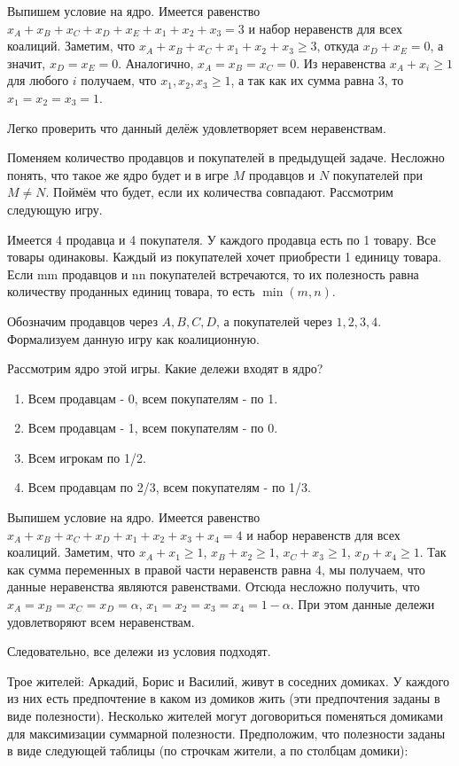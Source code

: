 	\solution
Выпишем условие на ядро. Имеется равенство $x_{A}+x_{B}+x_{C}+x_{D}+x_{E}+x_{1}+x_2+x_3=3$ и набор неравенств для всех коалиций. Заметим, что $x_A+x_B+x_C +x_1+x_2+x_3 \geq 3$, откуда $x_D+x_E=0$, а значит, $x_D=x_E=0$. Аналогично, $x_A=x_B=x_C=0$. Из неравенства $x_A+x_i\geq 1$ для любого $i$ получаем, что $x_1, x_2, x_3 \geq 1$, а так как их сумма равна 3, то $x_1=x_2=x_3=1$.

Легко проверить что данный делёж удовлетворяет всем неравенствам.
	
	\task
	Поменяем количество продавцов и покупателей в предыдущей задаче. Несложно понять, что такое же ядро будет и в игре $M$ продавцов и $N$ покупателей при $M \neq N$. Поймём что будет, если их количества совпадают. Рассмотрим следующую игру.
	
	Имеется 4 продавца и 4 покупателя. У каждого продавца есть по 1 товару. Все товары одинаковы. Каждый из покупателей хочет приобрести 1 единицу товара. Если mm продавцов и nn покупателей встречаются, то их полезность равна количеству проданных единиц товара, то есть $\min(m,n)$.
	
	Обозначим продавцов через $A,B,C,D$, а покупателей через $1,2,3,4$. Формализуем данную игру как коалиционную.
	
	Рассмотрим ядро этой игры. Какие дележи входят в ядро?
	
	\begin{enumerate}[label=$\circledcirc$]
		\item Всем продавцам - 0, всем покупателям - по 1.
		\item Всем продавцам - 1, всем покупателям - по 0.
		\item Всем игрокам по 1/2.
		\item Всем продавцам по 2/3, всем покупателям - по 1/3.
	\end{enumerate}

	\solution
	Выпишем условие на ядро. Имеется равенство $x_{A}+x_{B}+x_{C}+x_{D}+x_{1}+x_2+x_3+x_4=4$ и набор неравенств для всех коалиций. Заметим, что $x_{A}+x_1\geq 1$, $x_B+x_2 \geq 1$, $x_C+x_3\geq 1$, $x_D+x_4\geq 1$. Так как сумма переменных в правой части неравенств равна 4, мы получаем, что данные неравенства являются равенствами. Отсюда несложно получить, что $x_A=x_B=x_C=x_D=\alpha$, $x_1=x_2=x_3=x_4=1-\alpha$. При этом данные дележи удовлетворяют всем неравенствам.
	
	Следовательно, все дележи из условия подходят.

	\task
	\label{sec4}
	Трое жителей: Аркадий, Борис и Василий, живут в соседних домиках. У каждого из них есть предпочтение в каком из домиков жить (эти предпочтения заданы в виде полезности). Несколько жителей могут договориться поменяться домиками для максимизации суммарной полезности. Предположим, что полезности заданы в виде следующей таблицы (по строчкам жители, а по столбцам домики):
	
